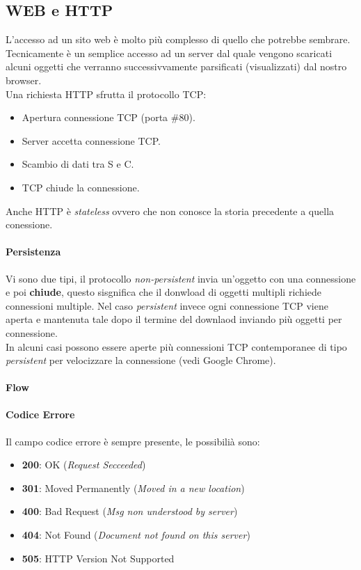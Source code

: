 \documentclass[12pt]{article}
\begin{document}
\subsection{WEB e HTTP}
L'accesso ad un sito web è molto più complesso di quello che potrebbe sembrare. Tecnicamente è un semplice accesso ad un server dal quale vengono scaricati alcuni oggetti che verranno successivvamente parsificati (visualizzati) dal nostro browser.\\
Una richiesta HTTP sfrutta il protocollo TCP:
\begin{itemize}
  \item Apertura connessione TCP (porta \#80).
  \item Server accetta connessione TCP.
  \item Scambio di dati tra S e C.
  \item TCP chiude la connessione.
\end{itemize}
Anche HTTP è \textit{stateless} ovvero che non conosce la storia precedente a quella conessione.
\paragraph{Persistenza} Vi sono due tipi, il protocollo \textit{non-persistent} invia un'oggetto con una connessione e poi \textbf{chiude}, questo sisgnifica che il donwload di oggetti multipli richiede connessioni multiple. Nel caso \textit{persistent} invece ogni connessione TCP viene aperta e mantenuta tale dopo il termine del downlaod inviando più oggetti per connessione.\\
In alcuni casi possono essere aperte più connessioni TCP contemporanee di tipo \textit{persistent} per velocizzare la connessione (vedi Google Chrome).

\paragraph{Flow}

\paragraph{Codice Errore} Il campo codice errore è sempre presente, le possibilià sono:
\begin{itemize}
  \item \textbf{200}: OK (\textit{Request Secceeded})
  \item \textbf{301}: Moved Permanently (\textit{Moved in a new location})
  \item \textbf{400}: Bad Request (\textit{Msg non understood by server})
  \item \textbf{404}: Not Found (\textit{Document not found on this server})
  \item \textbf{505}: HTTP Version Not Supported
\end{itemize}
\end{document}
